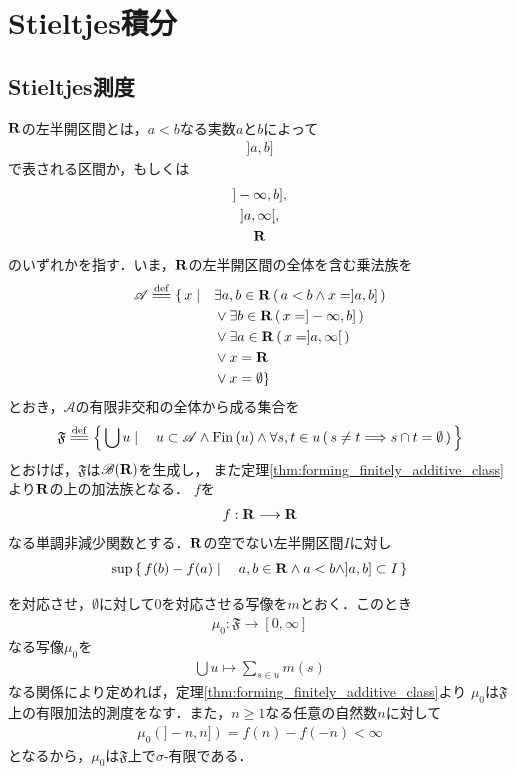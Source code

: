 \section{Stieltjes積分}
\subsection{Stieltjes測度}
	$\mathbf{R}$の左半開区間とは，$a < b$なる実数$a$と$b$によって
	\begin{align}
		]a,b]
	\end{align}
	で表される区間か，もしくは
	\begin{align}
		\begin{gathered}
			]-\infty,b],\\ 
			]a,\infty[,\\ 
			\mathbf{R}
		\end{gathered}
	\end{align}
	のいずれかを指す．いま，$\mathbf{R}$の左半開区間の全体を含む乗法族を
	\begin{align}
		\mathscr{A} \defeq \{\, x \mid \quad &\exists a,b \in \R\, (\, a < b \wedge x=]a,b] \, ) \\
		&\vee \exists b \in \R\, (\, x = ]-\infty,b]\, ) \\
		&\vee \exists a \in \R\, (\, x = ]a,\infty[\, ) \\
		&\vee x = \R\, \\
		&\vee x = \emptyset \}
	\end{align}
	とおき，$\mathscr{A}$の有限非交和の全体から成る集合を
	\begin{align}
		\mathfrak{F} \defeq \Set{\bigcup u}{u \subset \mathscr{A} \wedge \Fin{u} 
		\wedge \forall s,t \in u\, (\, s \neq t \Longrightarrow s \cap t = \emptyset\, )}
	\end{align}
	とおけば，$\mathfrak{F}$は$\mathscr{B}(\mathbf{R})$を生成し，
	また定理\ref{thm:forming_finitely_additive_class}より$\mathbf{R}$の上の加法族となる．
	$f$を
	\begin{align}
		f:\mathbf{R} \longrightarrow \mathbf{R}
	\end{align}
	なる単調非減少関数とする．$\mathbf{R}$の空でない左半開区間$I$に対し
	\begin{align}
		\operatorname*{sup}_{} \left\{\, f(b) - f(a) \mid \quad a,b \in \mathbf{R} \wedge a < b \wedge ]a,b] \subset I\, \right\}
	\end{align}
	を対応させ，$\emptyset$に対して$0$を対応させる写像を$m$とおく．このとき
	\begin{align}
		\mu_0:\mathfrak{F} \longrightarrow [0,\infty]
	\end{align}
	なる写像$\mu_0$を
	\begin{align}
		\bigcup u \longmapsto \sum_{s \in u}m(s)
	\end{align}
	なる関係により定めれば，定理\ref{thm:forming_finitely_additive_class}より
	$\mu_0$は$\mathfrak{F}$上の有限加法的測度をなす．また，$n \geq 1$なる任意の自然数$n$に対して
	\begin{align}
		\mu_0(]-n,n]) = f(n) - f(-n) < \infty
	\end{align}
	となるから，$\mu_0$は$\mathfrak{F}$上で$\sigma$-有限である．
	
